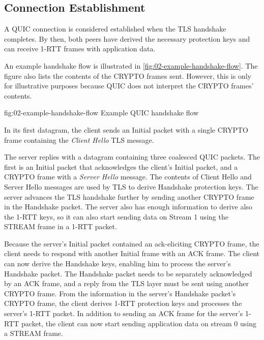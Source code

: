 \subsection{Connection Establishment}

A QUIC connection is considered established when the TLS handshake completes. By then, both peers
have derived the necessary protection keys and can receive 1-RTT frames with application data.

An example handshake flow is illustrated in \autoref{fig:02-example-handshake-flow}. The figure also
lists the contents of the CRYPTO frames sent. However, this is only for illustrative purposes
because QUIC does not interpret the CRYPTO frames' contents.

\begin{myFigure} {fig:02-example-handshake-flow} {Example QUIC handshake flow}

  \resizebox{\linewidth}{!}{}

\end{myFigure}

In its first datagram, the client sends an Initial packet with a single CRYPTO frame containing the
\textit{Client Hello} TLS message.

The server replies with a datagram containing three coalesced QUIC packets. The first is an Initial
packet that acknowledges the client's Initial packet, and a CRYPTO frame with a \textit{Server
Hello} message. The contents of Client Hello and Server Hello messages are used by TLS to derive
Handshake protection keys. The server advances the TLS handshake further by sending another CRYPTO
frame in the Handshake packet. The server also has enough information to derive also the 1-RTT keys,
so it can also start sending data on Stream 1 using the STREAM frame in a 1-RTT packet.

Because the server's Initial packet contained an ack-eliciting CRYPTO frame, the client needs to
respond with another Initial frame with an ACK frame. The client can now derive the Handshake keys,
enabling him to process the server's Handshake packet. The Handshake packet needs to be separately
acknowledged by an ACK frame, and a reply from the TLS layer must be sent using another CRYPTO
frame. From the information in the server's Handshake packet's CRYPTO frame, the client derives
1-RTT protection keys and processes the server's 1-RTT packet. In addition to sending an ACK frame
for the server's 1-RTT packet, the client can now start sending application data on stream 0 using a
STREAM frame.


